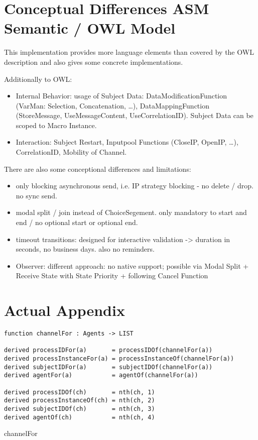 
\footnotesize

\section{Conceptual Differences ASM Semantic / OWL Model}


This implementation provides more language elements than covered by the OWL description and also gives some concrete implementations.

Additionally to OWL:
\begin{itemize}
    \item Internal Behavior: usage of Subject Data: DataModificationFunction (VarMan: Selection, Concatenation, \ldots), DataMappingFunction (StoreMessage, UseMessageContent, UseCorrelationID).
    Subject Data can be scoped to Macro Instance.
    \item Interaction: Subject Restart, Inputpool Functions (CloseIP, OpenIP, \ldots), CorrelationID, Mobility of Channel.
\end{itemize}

There are also some conceptional differences and limitations:
\begin{itemize}
    \item only blocking asynchronous send, i.e. IP strategy blocking - no delete / drop. no sync send.
    \item modal split / join instead of ChoiceSegement. only mandatory to start and end / no optional start or optional end.
    \item timeout transitions: designed for interactive validation -> duration in seconds, no business days. also no reminders.
    \item Observer: different approach: no native support; possible via Modal Split + Receive State with State Priority + following Cancel Function
\end{itemize}



\newpage
\section{Actual Appendix}

\begin{listing}[H]
\begin{verbatim}
function channelFor : Agents -> LIST

derived processIDFor(a)       = processIDOf(channelFor(a))
derived processInstanceFor(a) = processInstanceOf(channelFor(a))
derived subjectIDFor(a)       = subjectIDOf(channelFor(a))
derived agentFor(a)           = agentOf(channelFor(a))

derived processIDOf(ch)       = nth(ch, 1)
derived processInstanceOf(ch) = nth(ch, 2)
derived subjectIDOf(ch)       = nth(ch, 3)
derived agentOf(ch)           = nth(ch, 4)
\end{verbatim}
\caption{channelFor}
\label{lst:asm:channelFor}
\end{listing}


